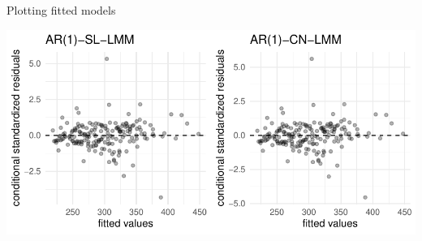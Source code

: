 \begin{frame}[fragile]{Plotting fitted models}
\protect\hypertarget{plot-fitted-models}{}

\scriptsize

\begin{Shaded}
\begin{Highlighting}[]
\NormalTok{(} \NormalTok{)}\OperatorTok{+}\NormalTok{(}\NormalTok{),}
              \NormalTok{)}\OperatorTok{+}\NormalTok{(}\NormalTok{),}
             \NormalTok{)}
\end{Highlighting}
\end{Shaded}

\begin{center}\includegraphics[width=0.85\linewidth]{codes_files/figure-beamer/extra1-1} \end{center}

\end{frame}

